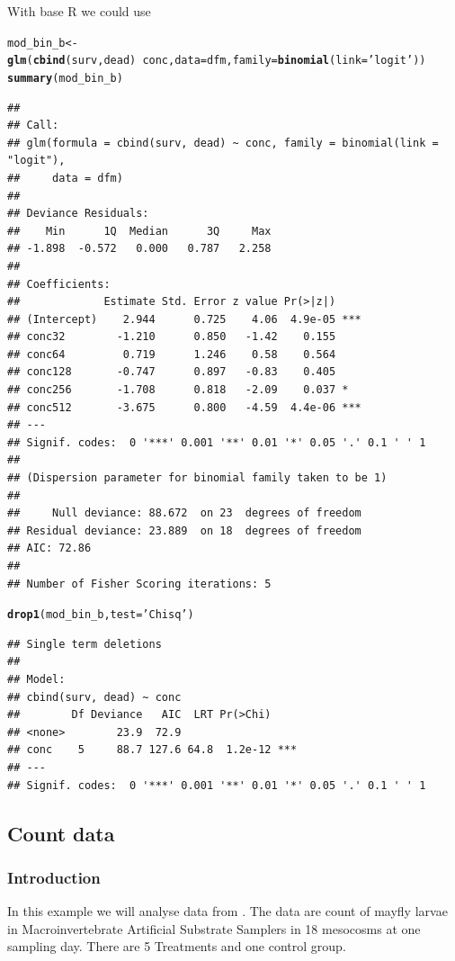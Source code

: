 \documentclass{scrartcl}\usepackage[]{graphicx}\usepackage[]{color}
\makeatletter
\newcommand{\hlstr}[1]{\textcolor[rgb]{0.192,0.494,0.8}{#1}}%
\newcommand{\hlopt}[1]{\textcolor[rgb]{0,0,0}{#1}}%
\newcommand{\hlstd}[1]{\textcolor[rgb]{0.345,0.345,0.345}{#1}}%
\newcommand{\hlkwb}[1]{\textcolor[rgb]{0.69,0.353,0.396}{#1}}%
\newcommand{\hlkwc}[1]{\textcolor[rgb]{0.333,0.667,0.333}{#1}}%
\newcommand{\hlkwd}[1]{\textcolor[rgb]{0.737,0.353,0.396}{\textbf{#1}}}%
\newenvironment{kframe}{%
 \def\at@end@of@kframe{}%
 \ifinner\ifhmode%
  \def\at@end@of@kframe{\end{minipage}}%
  \begin{minipage}{\columnwidth}%
 \fi\fi%
 \def\FrameCommand##1{\hskip\@totalleftmargin \hskip-\fboxsep
 \colorbox{shadecolor}{##1}\hskip-\fboxsep
     \hskip-\linewidth \hskip-\@totalleftmargin \hskip\columnwidth}%
 \MakeFramed {\advance\hsize-\width
   \@totalleftmargin\z@ \linewidth\hsize
   \@setminipage}}%
 {\par\unskip\endMakeFramed%
 \at@end@of@kframe}
\newenvironment{knitrout}{}{} %
\makeatother
\begin{document}
With base R we could use
\begin{knitrout}
\color{fgcolor}\begin{kframe}
\begin{alltt}
\hlstd{mod_bin_b} \hlkwb{<-} \hlkwd{glm}\hlstd{(}\hlkwd{cbind}\hlstd{(surv, dead)} \hlopt{~} \hlstd{conc,} \hlkwc{data} \hlstd{= dfm,} \hlkwc{family} \hlstd{=} \hlkwd{binomial}\hlstd{(}\hlkwc{link} \hlstd{=} \hlstr{'logit'}\hlstd{))}
\hlkwd{summary}\hlstd{(mod_bin_b)}
\end{alltt}
\begin{verbatim}
## 
## Call:
## glm(formula = cbind(surv, dead) ~ conc, family = binomial(link = "logit"), 
##     data = dfm)
## 
## Deviance Residuals: 
##    Min      1Q  Median      3Q     Max  
## -1.898  -0.572   0.000   0.787   2.258  
## 
## Coefficients:
##             Estimate Std. Error z value Pr(>|z|)    
## (Intercept)    2.944      0.725    4.06  4.9e-05 ***
## conc32        -1.210      0.850   -1.42    0.155    
## conc64         0.719      1.246    0.58    0.564    
## conc128       -0.747      0.897   -0.83    0.405    
## conc256       -1.708      0.818   -2.09    0.037 *  
## conc512       -3.675      0.800   -4.59  4.4e-06 ***
## ---
## Signif. codes:  0 '***' 0.001 '**' 0.01 '*' 0.05 '.' 0.1 ' ' 1
## 
## (Dispersion parameter for binomial family taken to be 1)
## 
##     Null deviance: 88.672  on 23  degrees of freedom
## Residual deviance: 23.889  on 18  degrees of freedom
## AIC: 72.86
## 
## Number of Fisher Scoring iterations: 5
\end{verbatim}
\begin{alltt}
\hlkwd{drop1}\hlstd{(mod_bin_b,} \hlkwc{test} \hlstd{=} \hlstr{'Chisq'}\hlstd{)}
\end{alltt}
\begin{verbatim}
## Single term deletions
## 
## Model:
## cbind(surv, dead) ~ conc
##        Df Deviance   AIC  LRT Pr(>Chi)    
## <none>        23.9  72.9                  
## conc    5     88.7 127.6 64.8  1.2e-12 ***
## ---
## Signif. codes:  0 '***' 0.001 '**' 0.01 '*' 0.05 '.' 0.1 ' ' 1
\end{verbatim}
\end{kframe}
\end{knitrout}



\subsection{Count data}
\subsubsection{Introduction}
In this example we will analyse data from \citep{brock_minimum_2014}.
The data are count of mayfly larvae in Macroinvertebrate Artificial Substrate Samplers in 18 mesocosms at one sampling day.
There are 5 Treatments and one control group.
\end{document}
